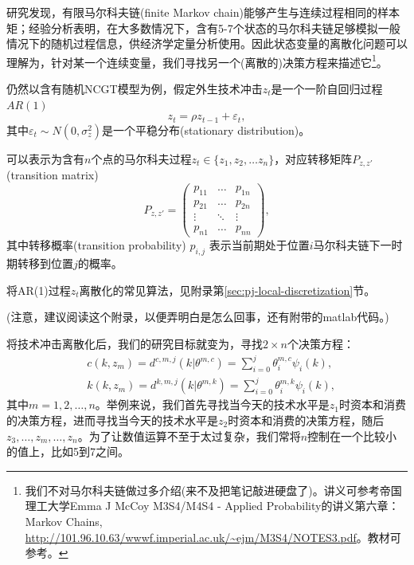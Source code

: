 研究发现，有限马尔科夫链(finite Markov chain)能够产生与连续过程相同的样本矩；经验分析表明，在大多数情况下，含有5-7个状态的马尔科夫链足够模拟一般情况下的随机过程信息，供经济学定量分析使用\citep{Tauchen:1986gi, Kopecky:2010du}。因此状态变量的离散化问题可以理解为，针对某一个连续变量，我们寻找另一个(离散的)决策方程来描述它\footnote{我们不对马尔科夫链做过多介绍(来不及把笔记敲进硬盘了)。讲义可参考帝国理工大学Emma J McCoy M3S4/M4S4 - Applied Probability的讲义第六章：Markov Chains, \url{http://101.96.10.63/wwwf.imperial.ac.uk/~ejm/M3S4/NOTES3.pdf}。教材可参考\cite{Privault:2013vc}。}。

仍然以含有随机NCGT模型为例，假定外生技术冲击$z_t$是一个一阶自回归过程$AR(1)$
\begin{equation*}
  z_t = \rho z_{t-1} + \varepsilon_t,
\end{equation*}
其中$\varepsilon_t \sim N(0,\sigma^2_z)$是一个平稳分布(stationary distribution)。

可以表示为含有$n$个点的马尔科夫过程$z_t \in \{ z_1, z_2, \ldots z_n \}$，对应转移矩阵$P_{z,z'}$ (transition matrix)
\begin{equation}
  \label{pj-discrete-transition-matrix-def}
  P_{z,z'}=\begin{pmatrix}
  p_{11}& \ldots &p_{1n} \\
  p_{21}& \ldots &p_{2n} \\
  \vdots& \ddots & \vdots \\
  p_{n1} & \ldots & p_{nn}
  \end{pmatrix},
\end{equation}
其中转移概率(transition probability) $p_{i,j}$ 表示当前期处于位置$i$马尔科夫链下一时期转移到位置$j$的概率。

将AR(1)过程$z_t$离散化的常见算法，见附录第\ref{sec:pj-local-discretization}节。

(注意，建议阅读这个附录，以便弄明白是怎么回事，还有附带的matlab代码。)

将技术冲击离散化后，我们的研究目标就变为，寻找$2 \times n$个决策方程：
\begin{equation*}
  \begin{split}
    &c \left( k, z_m \right) = d^{c,m,j} \left( k | \theta^{m,c} \right) = \sum_{i=0}^{j} \theta_{i}^{m,c} \psi_i(k), \\
    &k \left( k, z_m \right) = d^{k,m,j} \left( k | \theta^{m,k} \right) = \sum_{i=0}^{j} \theta_{i}^{m,k} \psi_i(k),
  \end{split}
\end{equation*}
其中$m=1,2,\ldots,n$。举例来说，我们首先寻找当今天的技术水平是$z_1$时资本和消费的决策方程，进而寻找当今天的技术水平是$z_2$时资本和消费的决策方程，随后$z_3, \ldots, z_m, \ldots, z_n$。为了让数值运算不至于太过复杂，我们常将$n$控制在一个比较小的值上，比如5到7之间。

